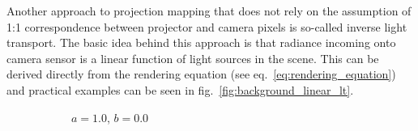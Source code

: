 Another approach to projection mapping that does not rely on the assumption of 1:1 correspondence between projector and camera pixels is so-called inverse light transport. The basic idea behind this approach is that radiance incoming onto camera sensor is a linear function of light sources in the scene. This can be derived directly from the rendering equation (see eq.~\ref{eq:rendering_equation}) and practical examples can be seen in fig.~\ref{fig:background_linear_lt}.

\begin{figure}[ht]
    \centering
    \begin{subfigure}[b]{0.24\textwidth}
        \centering
        \caption*{\(a = 1.0\), \(b = 0.0\)}
    \end{subfigure}
    \hfill
    \begin{subfigure}[b]{0.24\textwidth}
        \centering
        \begin{tikzpicture}

\end{tikzpicture}
\end{subfigure}
\end{figure}
